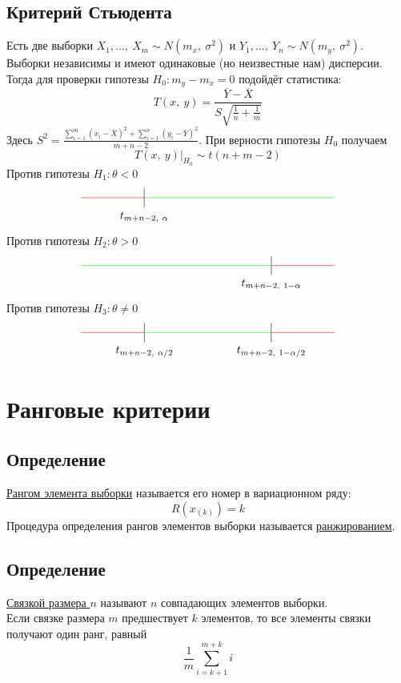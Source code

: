 \documentclass[12pt, a4paper]{article}
\begin{document}
\subsection*{Критерий Стьюдента}
Есть две выборки $X_1,\dots,\ X_m \sim N(m_x,\ \sigma^2)$ и $Y_1,\dots,\ Y_n \sim N(m_y,\ \sigma^2)$. Выборки независимы и имеют одинаковые (но неизвестные нам) дисперсии.\\
Тогда для проверки гипотезы $H_0: m_y - m_x = 0$ подойдёт статистика:
\[T(x,\ y) = \frac{\overline{Y} - \overline{X}}{S \sqrt{\frac{1}{n} + \frac{1}{m}}}\]
Здесь $S^2 = \frac{\sum_{i = 1}^{m} \left( x_i - \overline{X} \right)^2 + \sum_{i = 1}^{n} \left( y_i - \overline{Y} \right)^2}{m + n - 2}$. При верности гипотезы $H_0$ получаем
\[T(x,\ y)\big|_{H_0} \sim t(n + m - 2)\]
Против гипотезы $H_1: \theta < 0$
\[\begin{tikzpicture}[scale = 2]
    \draw[color=green] (-1, 0) -- (2, 0);
    \draw[color=red] (-2, 0) -- (-1, 0);
    \draw (-1, -0.15) -- (-1, 0.15);
    \node at (-1, -0.3) (a) {$t_{m + n - 2,\ \alpha}$};
\end{tikzpicture}\]
Против гипотезы $H_2: \theta > 0$
\[\begin{tikzpicture}[scale = 2]
    \draw[color=green] (-2, 0) -- (1, 0);
    \draw[color=red] (1, 0) -- (2, 0);
    \draw (1, 0.15) -- (1, -0.15);
    \node at (1, -0.3) (a) {$t_{m + n - 2,\ 1 - \alpha}$};
\end{tikzpicture}\]
Против гипотезы $H_3: \theta \neq 0$
\[\begin{tikzpicture}[scale = 2]
    \draw[color=red] (-2, 0) -- (-1, 0);
    \draw[color=red] (1, 0) -- (2, 0);
    \draw[color=green] (-1, 0) -- (1, 0);
    \draw (1, -0.15) -- (1, 0.15);
    \draw (-1, -0.15) -- (-1, 0.15);
    \node at(-1, -0.3) (a) {$t_{m + n - 2,\ \alpha/2}$};
    \node at(1, -0.3) (a) {$t_{m + n - 2,\ 1 - \alpha/2}$};
\end{tikzpicture}\]
\section*{Ранговые критерии}
\subsection*{Определение}
\underline{Рангом элемента выборки} называется его номер в вариационном ряду:
\[R(x_{(k)}) = k\]
Процедура определения рангов элементов выборки называется \underline{ранжированием}.
\subsection*{Определение}
\underline{Связкой размера $n$} называют $n$ совпадающих элементов выборки.\\
Если связке размера $m$ предшествует $k$ элементов, то все элементы связки получают один ранг, равный
\[\frac{1}{m} \sum_{i = k + 1}^{m + k} i\]
\end{document}

